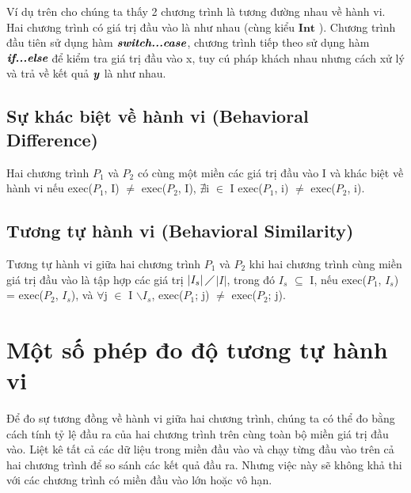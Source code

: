 




Ví dụ trên cho chúng ta thấy 2 chương trình là tương đường nhau về
hành vi. Hai chương trình có giá trị đầu vào là như nhau (cùng kiểu
$\textbf{Int}$ ). Chương trình đầu tiên sử dụng hàm
$\textit{\textbf{switch...case}}$, chương trình tiếp theo sử dụng hàm
$\textit{\textbf{if...else}}$ để kiểm tra giá trị đầu vào x, tuy cú pháp
khách nhau nhưng cách xử lý và trả về kết quả $\textbf{\textit{y}}$ là
như nhau.
	
\subsection{Sự khác biệt về hành vi (Behavioral Difference)}
\begin{definition}
  Hai chương trình $P_{1}$ và $P_{2}$ có cùng một miền các giá trị đầu
  vào I và khác biệt về hành vi nếu exec($P_{1}$, I) $\neq$
  exec($P_{2}$, I), $\nexists$i $\in$ I exec($P_{1}$, i) $\neq$
  exec($P_{2}$, i).
\end{definition}

\subsection{Tương tự hành vi (Behavioral Similarity)}
\begin{definition}
  Tương tự hành vi giữa hai chương trình $P_{1}$ và $P_{2}$ khi hai
  chương trình cùng miền giá trị đầu vào là tập hợp các giá trị
  $\left|I_{s}\right|\diagup$$\left|I\right|$, trong đó
  $I_{s}$ $\subseteq $ I, nếu exec($P_{1}$, $I_{s}$) =
  exec($P_{2}$, $I_{s}$), và $\forall$j $\in$ I
  $\backslash$$I_{s}$, exec($P_{1}$; j) $\neq$ exec($P_{2}$; j).
\end{definition}

\section{Một số phép đo độ tương tự hành vi}
Để đo sự tương đồng về hành vi giữa hai chương trình, chúng ta có thể đo bằng cách tính tỷ lệ đầu ra của hai chương trình trên cùng toàn bộ miền giá trị đầu vào. Liệt kê tất cả các dữ liệu trong miền đầu vào và chạy từng đầu vào trên cả hai chương trình để so sánh các kết quả đầu ra. Nhưng việc này sẽ không khả thi với các chương trình có miền đầu vào lớn hoặc vô hạn.
	
